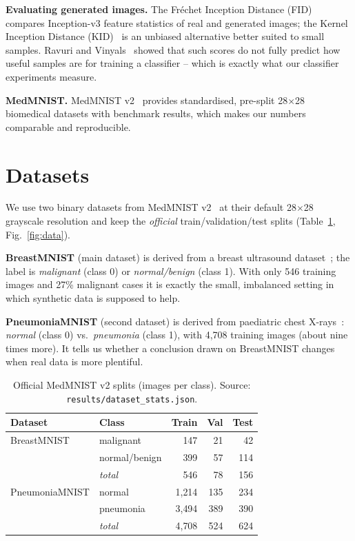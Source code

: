 \textbf{Evaluating generated images.} The Fr\'echet Inception Distance (FID)~\cite{heusel2017fid} compares Inception-v3
feature statistics of real and generated images; the Kernel Inception Distance (KID)~\cite{binkowski2018kid} is an
unbiased alternative better suited to small samples. Ravuri and Vinyals~\cite{ravuri2019cas} showed that such scores do not
fully predict how useful samples are for training a classifier -- which is exactly what our classifier experiments measure.

\textbf{MedMNIST.} MedMNIST v2~\cite{yang2023medmnist} provides standardised, pre-split 28$\times$28 biomedical datasets with
benchmark results, which makes our numbers comparable and reproducible.

\section{Datasets}
We use two binary datasets from MedMNIST v2~\cite{yang2023medmnist} at their default 28$\times$28 grayscale resolution and
keep the \emph{official} train/validation/test splits (Table~\ref{tab:data}, Fig.~\ref{fig:data}).

\textbf{BreastMNIST} (main dataset) is derived from a breast ultrasound dataset~\cite{aldhabyani2020busi}; the label is
\emph{malignant} (class 0) or \emph{normal/benign} (class 1). With only 546 training images and 27\% malignant cases it is
exactly the small, imbalanced setting in which synthetic data is supposed to help.

\textbf{PneumoniaMNIST} (second dataset) is derived from paediatric chest X-rays~\cite{kermany2018pneumonia}: \emph{normal}
(class 0) vs.\ \emph{pneumonia} (class 1), with 4{,}708 training images (about nine times more). It tells us whether a
conclusion drawn on BreastMNIST changes when real data is more plentiful.

\begin{table}[htbp]
\centering
\caption{Official MedMNIST v2 splits (images per class). Source: \texttt{results/dataset\_stats.json}.}
\label{tab:data}
\begin{tabular}{llrrr}
\toprule
Dataset & Class & Train & Val & Test \\
\midrule
BreastMNIST    & malignant      & 147   & 21  & 42  \\
               & normal/benign  & 399   & 57  & 114 \\
               & \emph{total}   & 546   & 78  & 156 \\
\midrule
PneumoniaMNIST & normal         & 1{,}214 & 135 & 234 \\
               & pneumonia      & 3{,}494 & 389 & 390 \\
               & \emph{total}   & 4{,}708 & 524 & 624 \\
\bottomrule
\end{tabular}
\end{table}

